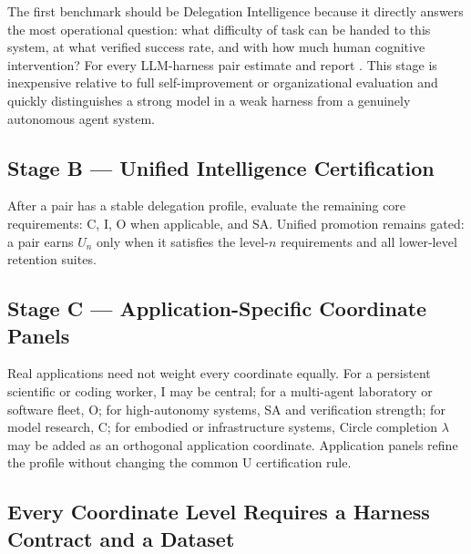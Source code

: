 The first benchmark should be Delegation Intelligence because it directly answers the most operational question: what difficulty of task can be handed to this system, at what verified success rate, and with how much human cognitive intervention? For every LLM-harness pair estimate \SA{} and report \FA{}. This stage is inexpensive relative to full self-improvement or organizational evaluation and quickly distinguishes a strong model in a weak harness from a genuinely autonomous agent system.

\subsection{Stage B --- Unified Intelligence Certification}

After a pair has a stable delegation profile, evaluate the remaining core requirements: C, I, O when applicable, and SA. Unified promotion remains gated: a pair earns $U_n$ only when it satisfies the level-$n$ requirements and all lower-level retention suites.

\subsection{Stage C --- Application-Specific Coordinate Panels}

Real applications need not weight every coordinate equally. For a persistent scientific or coding worker, I may be central; for a multi-agent laboratory or software fleet, O; for high-autonomy systems, SA and verification strength; for model research, C; for embodied or infrastructure systems, Circle completion $\lambda$ may be added as an orthogonal application coordinate. Application panels refine the profile without changing the common U certification rule.

\subsection{Every Coordinate Level Requires a Harness Contract and a Dataset}

